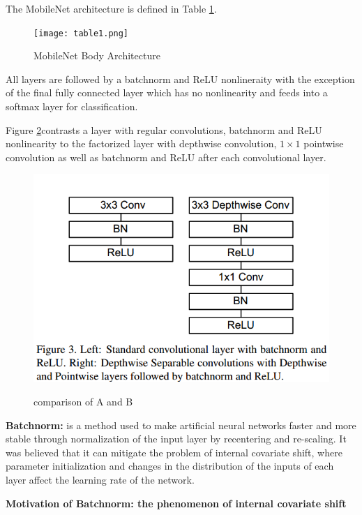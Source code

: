 \documentclass[11pt,en,bibstyle=ieeetr]{elegantpaper}
\begin{document}
The MobileNet architecture is defined in Table \ref{table1}.
\begin{figure}[h]
\caption{MobileNet Body Architecture}
\begin{center}
\texttt{[image: table1.png]}\label{table1}
\end{center}

\end{figure}

All layers are followed by a batchnorm and ReLU nonlineraity with the exception of the final fully connected layer which has no nonlinearity and feeds into a softmax layer for classification.

Figure \ref{comparison}contrasts a layer with regular convolutions, batchnorm and ReLU nonlinearity to the factorized layer with depthwise convolution, $ 1\times 1 $ pointwise convolution as well as batchnorm and ReLU after each convolutional layer.

\begin{figure}
	\centering
	\caption{comparison of A and B}
	\includegraphics{fig/contrast.png}
\label{comparison}
\end{figure}

\textbf{Batchnorm:} is a method used to make artificial neural networks faster and more 
stable through normalization of the input layer by recentering and re-scaling. It was believed
that it can mitigate the problem of internal covariate shift, where parameter initialization and changes in the distribution of the inputs of each layer affect the learning rate of the  network.


\textbf{Motivation of Batchnorm: the phenomenon of internal covariate shift}
\end{document}
